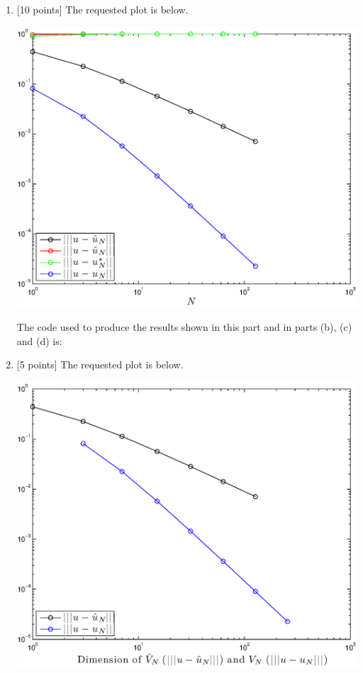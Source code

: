 \begin{solution}
\begin{enumerate}
\item {[10 points]} The requested plot is below.
\begin{center}
\includegraphics[scale=0.75]{hw34a.eps}
\end{center}
The code used to produce the results shown in this part and in parts (b), (c) and (d) is:



\vspace*{1em}
\item {[5 points]} The requested plot is below.
\begin{center}
\includegraphics[scale=0.75]{hw34b.eps}
\end{center}


\end{enumerate}
\end{solution}
